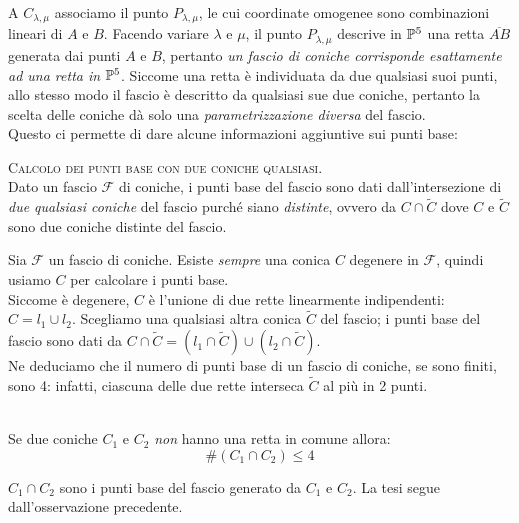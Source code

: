 A $C_{\lambda,\mu}$ associamo il punto $P_{\lambda,\mu}$, le cui coordinate omogenee sono combinazioni lineari di $A$ e $B$. Facendo variare $\lambda$ e $\mu$, il punto $P_{\lambda,\mu}$ descrive in $\proj[5]{\ }$ una retta $\overline{AB}$ generata dai punti $A$ e $B$, pertanto \textit{un fascio di coniche corrisponde esattamente ad una retta in} $\proj[5]{\ }$. Siccome una retta è individuata da due qualsiasi suoi punti, allo stesso modo il fascio è descritto da qualsiasi sue due coniche, pertanto la scelta delle coniche dà solo una \textit{parametrizzazione diversa} del fascio.\\
Questo ci permette di dare alcune informazioni aggiuntive sui punti base:
\begin{tips} \textsc{Calcolo dei punti base con due coniche qualsiasi}.\\
	Dato un fascio $\mathcal{F}$ di coniche, i punti base del fascio sono dati dall'intersezione di \textit{due qualsiasi coniche} del fascio purché siano \textit{distinte}, ovvero da $C\cap\widetilde{C}$ dove $C$ e $\widetilde{C}$ sono due coniche distinte del fascio.
\end{tips}
\begin{observe}
	Sia $\mathcal{F}$ un fascio di coniche. Esiste \textit{sempre} una conica $C$ degenere in $\mathcal{F}$, quindi usiamo $C$ per calcolare i punti base.\\
	Siccome è degenere, $C$ è l'unione di due rette linearmente indipendenti: $C=l_1\cup l_2$. Scegliamo una qualsiasi altra conica $\widetilde{C}$ del fascio; i punti base del fascio sono dati da $C\cap\widetilde{C}=(l_1\cap\widetilde{C})\cup (l_2\cap \widetilde{C})$.\\
	Ne deduciamo che il numero di punti base di un fascio di coniche, se sono finiti, sono 4: infatti, ciascuna delle due rette interseca $\widetilde{C}$ al più in 2 punti.
\end{observe}

\begin{corollary}~{}\\
	Se due coniche $C_1$ e $C_2$ \textit{non} hanno una retta in comune allora:
	\begin{equation}
		\#(C_1\cap C_2)\leq 4
	\end{equation}
\vspace{-6mm}
\end{corollary}
\begin{demonstration}
	$C_1\cap C_2$ sono i punti base del fascio generato da $C_1$ e $C_2$. La tesi segue dall'osservazione precedente.
\end{demonstration}

